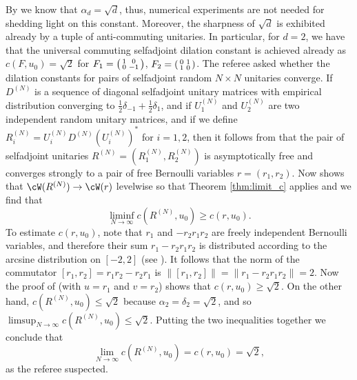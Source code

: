 \begin{remark}
By \cite[Theorem 6.7]{PSS18} we know that $\alpha_d = \sqrt{d}$, thus, numerical experiments are not needed for shedding light on this constant. 
Moreover, the sharpness of $\sqrt{d}$ is exhibited already by a tuple of anti-commuting unitaries. 
In particular, for $d = 2$, we have that the universal commuting selfadjoint dilation constant is achieved already as $c(F,u_0) = \sqrt{2}$ for $F_1 = \begin{psmallmatrix} 1 & 0\\ 0 & -1 \end{psmallmatrix}$, $F_2 = \begin{psmallmatrix} 0 & 1\\ 1 & 0 \end{psmallmatrix}$.
The referee asked whether the dilation constants for pairs of selfadjoint random $N \times N$ unitaries converge. 
If $D^{(N)}$ is a sequence of diagonal selfadjoint unitary matrices with empirical distribution converging to $\frac{1}{2} \delta_{-1} + \frac{1}{2} \delta_1$, and if $U^{(N)}_1$ and $U^{(N)}_2$ are two independent random unitary matrices, and if we define $R_i^{(N)} = U^{(N)}_i D^{(N)} (U^{(N)}_i)^*$ for $i = 1, 2$, then it follows from \cite[Theorem 1.4]{CM14} that the pair of selfadjoint unitaries $R^{(N)} = (R_1^{(N)}, R_2^{(N)})$ is asymptotically free and converges strongly to a pair of free Bernoulli variables $r = (r_1, r_2)$. 
Now \cite[Theorem 3.1]{GSh21} shows that $\cW(R^{(N)}) \to \cW(r)$ levelwise so that Theorem \ref{thm:limit_c} applies and we find that 
\[
\liminf_{N\to\infty} c(R^{(N)},u_0) \geq  c(r,u_0). 
\]
To estimate $c(r,u_0)$, note that $r_1$ and $-r_2r_1r_2$ are freely independent Bernoulli variables, and therefore their sum $r_1 - r_2 r_1 r_2$ is distributed according to the arcsine distribution on $[-2,2]$ (see \cite[Example 12.8]{NiSp06}). 
It follows that the norm of the commutator $[r_1, r_2] = r_1 r_2 - r_2 r_1$ is $\|[r_1, r_2] \| = \|r_1 - r_2 r_1 r_2\| = 2$. 
Now the proof of \cite[Theorem 3.9]{GPSS21} (with $u = r_1$ and $v = r_2$) shows that $c(r,u_0) \geq \sqrt{2}$. 
On the other hand, $c(R^{(N)},u_0) \leq  \sqrt{2}$ because $\alpha_2 = \delta_2 = \sqrt{2}$, and so $\limsup_{N\to\infty} c(R^{(N)},u_0) \leq \sqrt{2}$.  
Putting the two inequalities together we conclude that 
\[
\lim_{N \to \infty}c(R^{(N)},u_0) = c(r,u_0) = \sqrt{2} ,
\]
as the referee suspected.


\end{remark}
